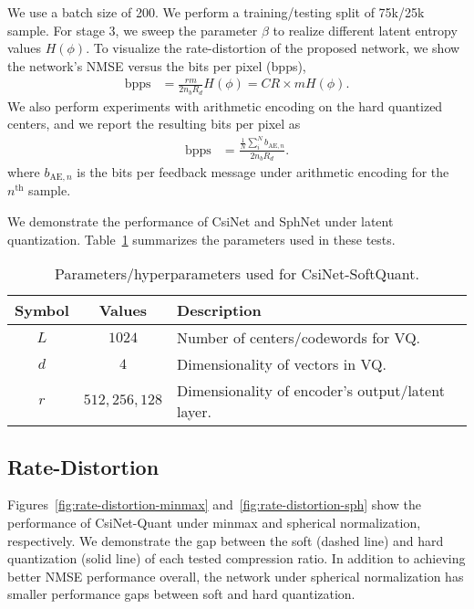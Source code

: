 We use a batch size of 200. We perform a training/testing split of 75k/25k sample. For stage 3, we sweep the parameter $\beta$ to realize different latent entropy values $H(\phi)$. To visualize the rate-distortion of the proposed network, we show the network's NMSE versus the bits per pixel (bpps), 
\begin{align*}
	\text{bpps}	 &= \frac{rm}{2 n_{b}R_{d}}H(\phi) = CR\times mH(\phi). %
\end{align*}
We also perform experiments with arithmetic encoding on the hard quantized centers, and we report the resulting bits per pixel as
\begin{align*}
	\text{bpps}	 &= \frac{\frac 1N \sum_{i}^N b_{\text{AE},n}}{2 n_{b}R_{d}}. %
\end{align*}
where $b_{\text{AE},n}$ is the bits per feedback message under arithmetic encoding for the $n^{\text{th}}$ sample.

We demonstrate the performance of CsiNet and SphNet under latent quantization. Table~\ref{tab:quant-params} summarizes the parameters used in these tests. %

\begin{table}[]
\centering
\caption{Parameters/hyperparameters used for CsiNet-SoftQuant.}
\label{tab:quant-params}
\begin{tabular}{c|c|l}
\toprule
\textbf{Symbol}   & \textbf{Values}  & \textbf{Description} \\ \midrule
$L$ 		  	  & $1024$	 		 & Number of centers/codewords for VQ.  \\ \hline
$d$               & $4$				 & Dimensionality of vectors in VQ.  \\ \hline
$r$               & $512,256,128$	 & Dimensionality of encoder's output/latent layer.  \\ \hline
\end{tabular}
\end{table}

\subsection{Rate-Distortion} \label{sec:results-rate-distortion}

Figures~\ref{fig:rate-distortion-minmax} and~\ref{fig:rate-distortion-sph} show the performance of CsiNet-Quant under minmax and spherical normalization, respectively. We demonstrate the gap between the soft (dashed line) and hard quantization (solid line) of each tested compression ratio. In addition to achieving better NMSE performance overall, the network under spherical normalization has smaller performance gaps between soft and hard quantization.

